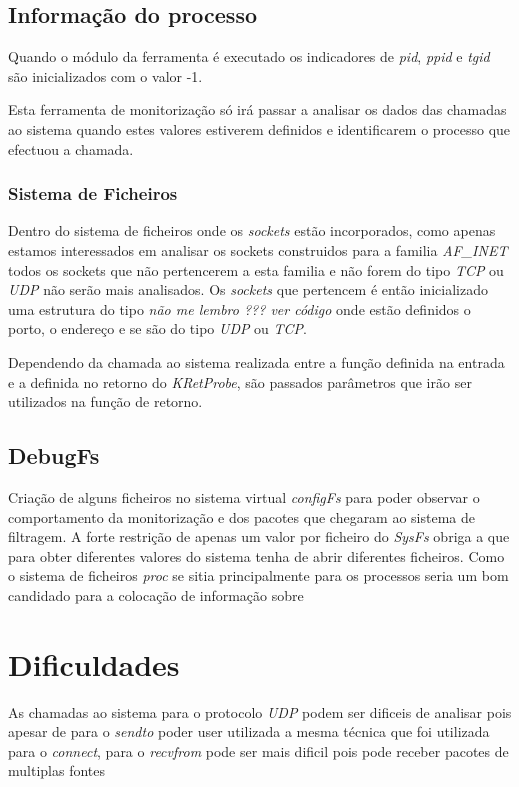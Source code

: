 \subsection{Informação do processo}

Quando o módulo da ferramenta é executado os indicadores de \textit{pid}, \textit{ppid} e \textit{tgid} são inicializados com o valor -1.

Esta ferramenta de monitorização só irá passar a analisar os dados das chamadas ao sistema quando estes valores estiverem definidos e identificarem o processo que efectuou a chamada.

\subsubsection{Sistema de Ficheiros}

Dentro do sistema de ficheiros onde os \textit{sockets} estão incorporados, como apenas estamos interessados em analisar os sockets construidos para a
familia \textit{AF\_INET} todos os sockets que não pertencerem a esta familia e não forem do tipo \textit{TCP} ou \textit{UDP} não serão mais analisados.
 Os \textit{sockets} que pertencem é então inicializado uma estrutura do tipo \textit{não me lembro ??? ver código} onde estão definidos o porto, o endereço
e se são do tipo \textit{UDP} ou \textit{TCP}.

Dependendo da chamada ao sistema realizada entre a função definida na entrada e a definida no retorno do \textit{KRetProbe}, são passados parâmetros que irão
ser utilizados na função de retorno.


\subsection{DebugFs}
Criação de alguns ficheiros no sistema virtual \textit{configFs} para poder observar o comportamento da monitorização e dos pacotes que chegaram ao sistema de filtragem.
A forte restrição de apenas um valor por ficheiro do \textit{SysFs} obriga a que para obter diferentes valores do sistema tenha de abrir diferentes ficheiros.
 Como o sistema de ficheiros \textit{proc} se sitia principalmente para os processos seria um bom candidado para a colocação de informação sobre 


\section{Dificuldades}
 As chamadas ao sistema para o protocolo \textit{UDP} podem ser dificeis de analisar pois apesar de para o \textit{sendto} poder user utilizada a mesma técnica que foi utilizada para o \textit{connect}, para o \textit{recvfrom} pode ser mais dificil pois pode receber pacotes de multiplas fontes
